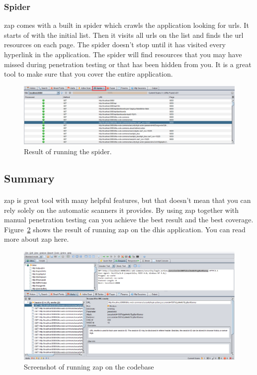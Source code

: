 \documentclass[11pt,english,a4paper]{report}
\begin{document}
\subsubsection{Spider}
\gls{zap} comes with a built in spider which crawls the application looking for \glspl{url}.
It starts of with the initial list. 
Then it visits all \glspl{url} on the list and finds the \gls{url} resources on each page. 
The spider doesn't stop until it has visited every hyperlink in the application.
The spider will find resources that you may have missed during penetration testing or that has been hidden from you. 
It is a great tool to make sure that you cover the entire application.

\begin{figure}[h]
    \centering
    \includegraphics[scale=0.35]{images/zap-spider.png}
    \caption{Result of running the spider. }
    \label{fig:zapspider}
\end{figure}

\subsection{Summary}
\paragraph{}
\gls{zap} is great tool with many helpful features, but that doesn't mean that you can rely solely on the automatic scanners it provides. 
By using \gls{zap} together with manual penetration testing can you achieve the best result and the best coverage. 
Figure~\ref{fig:zapscreenshot}  shows the result of running \gls{zap} on the \gls{dhis} application. 
You can read more about \gls{zap} here. \cite{zap-documentation,zap-homepage}

\begin{figure}[h]
    \centering
    \includegraphics[scale=0.35]{images/zap-sc.png}
    \caption{Screenshot of running \gls{zap} on the codebase}
    \label{fig:zapscreenshot}
\end{figure}
\end{document}

